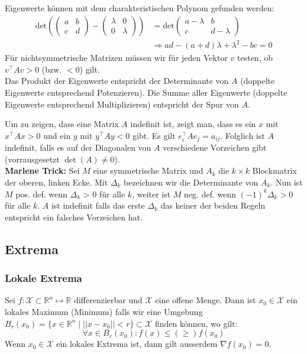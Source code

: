 \documentclass[a4paper,10pt]{article}
\def\R{\mathbb{R}}
\def\X{\mathcal{X}}
\begin{document}
Eigenwerte können mit dem charakteristischen Polynom gefunden werden:
\begin{align*}
  \text{det} \left(
  \begin{pmatrix}
    a & b\\
    c & d
  \end{pmatrix}
  -
  \begin{pmatrix}
    \lambda & 0\\
    0 & \lambda
  \end{pmatrix}
  \right)
  &=
  \text{det}
  \begin{pmatrix}
    a - \lambda & b\\
    c & d - \lambda
  \end{pmatrix}\\
  &\Rightarrow ad - (a + d) \lambda + \lambda^2 - bc = 0
\end{align*}
Für nichtsymmetrische Matrizen müssen wir für jeden Vektor \(v\) testen, ob \(v^\top A v > 0\) (bzw. \(< 0\)) gilt.\\
Das Produkt der Eigenwerte entspricht der Determinante von $A$ (doppelte Eigenwerte entsprechend Potenzieren). Die Summe aller Eigenwerte (doppelte Eigenwerte entsprechend Multiplizieren) entspricht der Spur von $A$.

Um zu zeigen, dass eine Matrix $A$ indefinit ist, zeigt man, dass es ein $x$ mit $x^\top A x > 0$ und ein $y$ mit $y^\top A y < 0$ gibt. Es gilt $e_i^\top A e_j = a_{ij}$. Folglich ist $A$ indefinit, falls es auf der Diagonalen von $A$ verschiedene Vorzeichen gibt (vorrausgesetzt $\det(A) \neq 0$).\\

\textbf{Marlene Trick:} Sei $M$ eine symmetrische Matrix und $A_k$ die $k \times k$ Blockmatrix der oberen, linken Ecke. Mit $\Delta_k$ bezeichnen wir die Determinante von $A_k$. Nun ist $M$ pos. def. wenn $\Delta_k$ > 0 für alle $k$, weiter ist $M$ neg. def.
wenn $(-1)^k \Delta_k > 0$ für alle $k$. $A$ ist indefinit falls das erste $\Delta_k$ das keiner der beiden Regeln entspricht ein falsches Vorzeichen hat.

\subsection{Extrema}
\subsubsection*{Lokale Extrema}
Sei \(f: \X \subset \R^n \mapsto \R\) differenzierbar und \(\X\) eine offene Menge. Dann ist \(x_0 \in \X\) ein lokales Maximum (Minimum) falls wir eine Umgebung \(B_r(x_0) = \{x\in \R^n \mid ||x-x_0|| < r \} \subset \X\) finden können, wo gilt:
\[\forall x \in B_r(x_0): f(x) \le (\ge) f(x_0)\]
Wenn \(x_0 \in \X\) ein lokales Extrema ist, dann gilt ausserdem \(\nabla f(x_0) = 0\).
\end{document}
